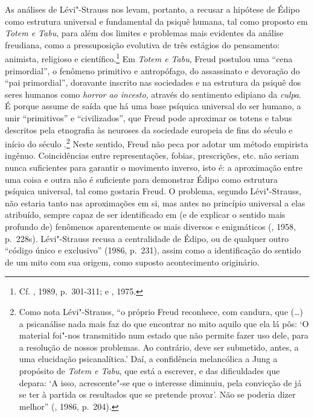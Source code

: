 As análises de Lévi"-Strauss nos levam, portanto, a recusar a hipótese de
Édipo como estrutura universal e fundamental da psiquê humana, tal como
proposto em \emph{Totem e Tabu}, para além dos limites e problemas mais
evidentes da análise freudiana, como a pressuposição evolutiva de três
estágios do pensamento: animista, religioso e científico.\footnote{Cf.
  , 1989, p.~301-311; e , 1975.} Em \emph{Totem e Tabu}, Freud
postulou uma ``cena primordial'', o fenômeno primitivo e antropófago, do
assassinato e devoração do ``pai primordial'', doravante inscrito nas
sociedades e na estrutura da psiquê dos seres humanos como \emph{horror
ao incesto}, através do sentimento edipiano da \emph{culpa}. É porque
assume de saída que há uma base psíquica universal do ser humano, a unir
``primitivos'' e ``civilizados'', que Freud pode aproximar os totens e
tabus descritos pela etnografia às neuroses da sociedade europeia de
fins do século  e início do século .\footnote{Como nota
  Lévi"-Strauss, ``o próprio Freud reconhece, com candura, que (\ldots{}) a
  psicanálise nada mais faz do que encontrar no mito aquilo que ela lá
  pôs: `O material foi"-nos transmitido num estado que não permite fazer
  uso dele, para a resolução de nossos problemas. Ao contrário, deve ser
  submetido, antes, a uma elucidação psicanalítica.' Daí, a confidência
  melancólica a Jung a propósito de \emph{Totem e Tabu}, que está a
  escrever, e das dificuldades que depara: `A isso, acrescente"-se que o
  interesse diminuiu, pela convicção de já se ter à partida os
  resultados que se pretende provar'. Não se poderia dizer melhor''
  (, 1986, p.~204).} Neste sentido, Freud não peca por adotar
um método empirista ingênuo. Coincidências entre representações, fobias,
prescrições, etc. não seriam nunca suficientes para garantir o movimento
inverso, isto é: a aproximação entre uma coisa e outra não é suficiente
para demonstrar Édipo como estrutura psíquica universal, tal como
gostaria Freud. O problema, segundo Lévi"-Strauss, não estaria tanto nas
aproximações em si, mas antes no princípio universal a elas atribuído,
sempre capaz de ser identificado em (e de explicar o sentido mais
profundo de) fenômenos aparentemente os mais diversos e
enigmáticos (, 1958, p.~228s). Lévi"-Strauss recusa a
centralidade de Édipo, ou de qualquer outro ``código único e
exclusivo'' (1986, p.~231), assim como a
identificação do sentido de um mito com sua origem, como suposto
acontecimento originário.

